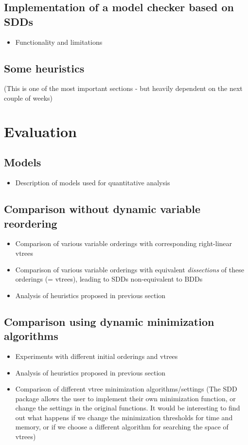 \documentclass[12]{article}
\begin{document}
\subsection{Implementation of a model checker based on SDDs}

\begin{itemize}
\item Functionality and limitations
\end{itemize}


\subsection{Some heuristics}
(This is one of the most important sections - but heavily dependent on the next couple of weeks)



\section{Evaluation} 

\subsection{Models}
\begin{itemize}
\item Description of models used for quantitative analysis 

\end{itemize}
\subsection{Comparison without dynamic variable reordering}
\begin{itemize}
\item Comparison of various variable orderings with corresponding right-linear vtrees
\item Comparison of various variable orderings with equivalent \textit{dissections} of these orderings (= vtrees), leading to SDDs non-equivalent to BDDs 
\item Analysis of heuristics proposed in previous section

\end{itemize}

\subsection{Comparison using dynamic minimization algorithms}
\begin{itemize}
\item Experiments with different initial orderings and vtrees
\item Analysis of heuristics proposed in previous section
\item Comparison of different vtree minimization algorithms/settings (The SDD package allows the user to implement their own minimization function, or change the settings in the original functions. It would be interesting to find out what happens if we change the minimization thresholds for time and memory, or if we choose a different algorithm for searching the space of vtrees) 
\end{itemize}
\end{document}
